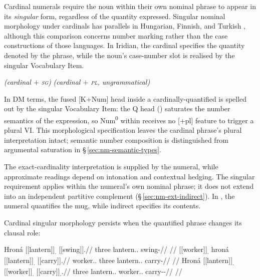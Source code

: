 Cardinal numerals require the noun within their own nominal phrase to appear
in its \emph{singular} form, regardless of the quantity expressed. Singular nominal morphology under
cardinals has parallels in Hungarian, Finnish, and Turkish
\cite[§\,1]{marti2020}, although this comparison concerns number marking
rather than the case constructions of those languages. In Iridian, the cardinal
specifies the quantity denoted by the phrase, while the noun's case-number slot
is realised by the singular Vocabulary Item.

\pex
\a {}  \hfill\textit{(cardinal $+$ \textsc{sg})}
\a {} \hfill\textit{(cardinal $+$ \textsc{pl}, ungrammatical)}
\xe

\noindent In DM terms, the fused [K$+$Num] head inside a cardinally-quantified
 is spelled out by the singular Vocabulary Item: the Q head
() saturates the number semantics of the expression, so
Num\textsuperscript{0} within  receives no [+pl] feature to trigger
a plural VI. This morphological specification leaves the cardinal phrase's
plural interpretation intact; semantic number composition is distinguished
from argumental saturation in §\,\ref{sec:nm-semantic-types}.

The exact-cardinality interpretation is supplied by the numeral, while
approximate readings depend on intonation and contextual hedging. The
singular requirement applies within the numeral's own nominal phrase;
it does not extend into an independent partitive complement
(§\,\ref{sec:nm-ext-indirect}). In 
, the numeral quantifies the mug, while indirect
 specifies its contents.

Cardinal singular morphology persists when the quantified phrase changes
its clausal role:

\pex\label{ex:nm-slot-cardinal-case}
\a
\begingl
\gla Hroná \textnormal{[[lantern]]}\textsubscript{\Dir{}.\Sg{}} \textnormal{[[swing]]}\textsubscript{\Prog{}}.//
\glb three lantern.\Dir{}.\Sg{} swing-\Prog{}//
\glft {} //
\endgl
\a
\begingl
\gla \textnormal{[[worker]]}\textsubscript{\Dir{}.\Sg{}} hroná \textnormal{[[lantern]]}\textsubscript{\Ind{}.\Sg{}} \textnormal{[[carry]]}\textsubscript{\Prog{}}.//
\glb worker.\Dir{}.\Sg{} three lantern.\Ind{}.\Sg{} carry-\Prog{}//
\glft {} //
\endgl
\a
\begingl
\gla Hroná \textnormal{[[lantern]]}\textsubscript{\Dir{}.\Sg{}} \textnormal{[[worker]]}\textsubscript{\Trs{}.\Sg{}} \textnormal{[[carry]]}\textsubscript{\Trs{}.\Pf{}}.//
\glb three lantern.\Dir{}.\Sg{} worker.\Trs{}.\Sg{} carry-\Trs{}-\Pf{}//
\glft {} //
\endgl
\xe

